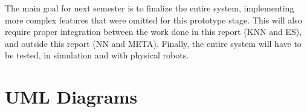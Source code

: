 \documentclass[titlepage,11pt]{article}
\newcommand{\code}[1]{\texttt{#1}}
\begin{document}
The main goal for next semester is to finalize the entire system, implementing more complex features that were omitted for this prototype stage. This will also require proper integration between the work done in this report (KNN and ES), and outside this report (NN and META). Finally, the entire system will have to be tested, in simulation and with physical robots.

\clearpage
\onecolumn
\appendix

\renewcommand\thefigure{\thesection.\arabic{figure}}
\setcounter{figure}{0}    

\section{UML Diagrams}
\label{sec:uml}




\clearpage

{}

\end{document}
